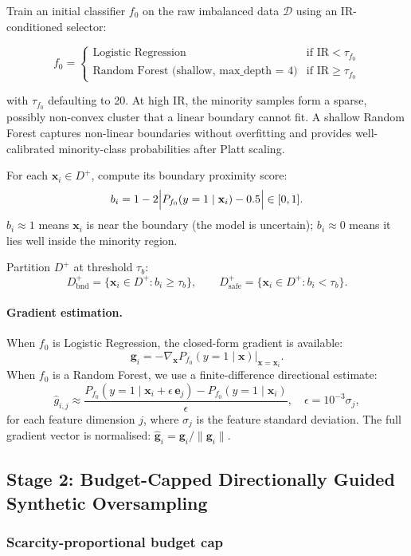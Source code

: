 \documentclass[11pt,a4paper]{article}
\newcommand{\Dplus}{D^{+}}
\newcommand{\Dbnd}{D^{+}_{\mathrm{bnd}}}
\newcommand{\Dsafe}{D^{+}_{\mathrm{safe}}}
\newcommand{\Pf}{P_{f_0}}
\newcommand{\IR}{\mathrm{IR}}
\begin{document}
Train an initial classifier $f_0$ on the raw imbalanced data $\mathcal{D}$ using an
IR-conditioned selector:

\[
  f_0 = \begin{cases}
    \text{Logistic Regression} & \text{if } \IR < \tau_{f_0} \\
    \text{Random Forest (shallow, max\_depth = 4)} & \text{if } \IR \ge \tau_{f_0}
  \end{cases}
\]

with $\tau_{f_0}$ defaulting to 20. At high IR, the minority samples form a sparse, possibly
non-convex cluster that a linear boundary cannot fit. A shallow Random Forest captures
non-linear boundaries without overfitting and provides well-calibrated minority-class
probabilities after Platt scaling.

For each $\mathbf{x}_i \in \Dplus$, compute its boundary proximity score:
\[
  b_i = 1 - 2\Bigl|\Pf(y=1 \mid \mathbf{x}_i) - 0.5\Bigr| \in [0,1].
\]
$b_i \approx 1$ means $\mathbf{x}_i$ is near the boundary (the model is uncertain);
$b_i \approx 0$ means it lies well inside the minority region.

Partition $\Dplus$ at threshold $\tau_b$:
\[
  \Dbnd = \{\mathbf{x}_i \in \Dplus : b_i \ge \tau_b\}, \qquad
  \Dsafe = \{\mathbf{x}_i \in \Dplus : b_i < \tau_b\}.
\]

\paragraph{Gradient estimation.} When $f_0$ is Logistic Regression, the closed-form gradient
is available:
\[
  \mathbf{g}_i = -\nabla_{\mathbf{x}} \Pf(y=1 \mid \mathbf{x})\big|_{\mathbf{x}=\mathbf{x}_i}.
\]
When $f_0$ is a Random Forest, we use a finite-difference directional estimate:
\[
  \hat{g}_{i,j} \approx \frac{\Pf(y=1 \mid \mathbf{x}_i + \epsilon\,\mathbf{e}_j) - \Pf(y=1 \mid \mathbf{x}_i)}{\epsilon},
  \quad \epsilon = 10^{-3} \sigma_j,
\]
for each feature dimension $j$, where $\sigma_j$ is the feature standard deviation.
The full gradient vector is normalised: $\hat{\mathbf{g}}_i = \mathbf{g}_i / \|\mathbf{g}_i\|$.

\subsection{Stage 2: Budget-Capped Directionally Guided Synthetic Oversampling}

\subsubsection*{Scarcity-proportional budget cap}
\end{document}
